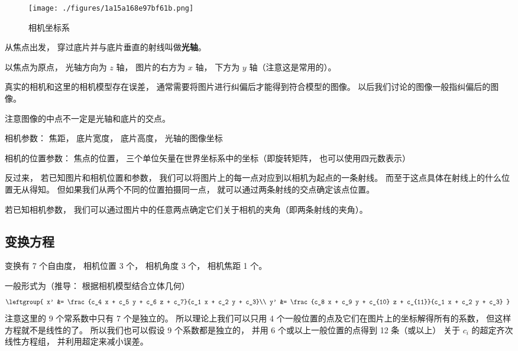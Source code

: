 
\begin{issues}
\issueDraft
\end{issues}


\begin{figure}[ht]
\centering
\texttt{[image: ./figures/1a15a168e97bf61b.png]}
\caption{相机坐标系} \label{fig_CamMdl_1}
\end{figure}

从焦点出发， 穿过底片并与底片垂直的射线叫做\textbf{光轴}。

以焦点为原点， 光轴方向为 $z$ 轴， 图片的右方为 $x$ 轴， 下方为 $y$ 轴（注意这是常用的）。

真实的相机和这里的相机模型存在误差， 通常需要将图片进行纠偏后才能得到符合模型的图像。 以后我们讨论的图像一般指纠偏后的图像。

注意图像的中点不一定是光轴和底片的交点。

相机参数： 焦距， 底片宽度， 底片高度， 光轴的图像坐标

相机的位置参数： 焦点的位置， 三个单位矢量在世界坐标系中的坐标（即旋转矩阵， 也可以使用四元数表示）

反过来， 若已知图片和相机位置和参数， 我们可以将图片上的每一点对应到以相机为起点的一条射线。 而至于这点具体在射线上的什么位置无从得知。 但如果我们从两个不同的位置拍摄同一点， 就可以通过两条射线的交点确定该点位置。

若已知相机参数， 我们可以通过图片中的任意两点确定它们关于相机的夹角（即两条射线的夹角）。

\subsection{变换方程}
变换有 7 个自由度， 相机位置 3 个， 相机角度 3 个， 相机焦距 1 个。

一般形式为（推导： 根据相机模型结合立体几何）
\begin{equation}\label{eq_CamMdl_1}
\leftgroup{
x' &= \frac{c_4 x + c_5 y + c_6 z + c_7}{c_1 x + c_2 y + c_3}\\
y' &= \frac{c_8 x + c_9 y + c_{10} z + c_{11}}{c_1 x + c_2 y + c_3}
}~
\end{equation}
注意这里的 9 个常系数中只有 7 个是独立的。 所以理论上我们可以只用 4 个一般位置的点及它们在图片上的坐标解得所有的系数， 但这样方程就不是线性的了。 所以我们也可以假设 9 个系数都是独立的， 并用 6 个或以上一般位置的点得到 12 条（或以上） 关于 $c_i$ 的超定齐次线性方程组， 并利用超定来减小误差。

